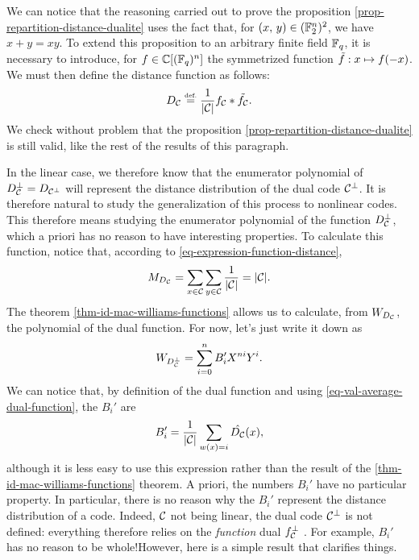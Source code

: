  
\begin{rem}
We can notice that the reasoning carried out to prove the proposition \ref{prop-repartition-distance-dualite} uses the fact that, for $ (x, \, y) \in (\mathbb{F}_2^n)^2 $, we have $ x + y = xy $. To extend this proposition to an arbitrary finite field $ \mathbb{F}_q $, it is necessary to introduce, for $ f \in \mathbb{C} [(\mathbb{F}_q)^n] $ the symmetrized function $ \tilde{f}: x \mapsto f(- x) $. We must then define the distance function as follows:
\begin{equation*}
D_{\mathcal{C}} \stackrel{\mbox{\upshape\tiny def.}}{=} \frac{1}{| \mathcal{C} |} f_{\mathcal{C}} * \tilde{f_{\mathcal{C}}}.
\end{equation*}
We check without problem that the proposition \ref{prop-repartition-distance-dualite} is still valid, like the rest of the results of this paragraph.
\end{rem}
  In the linear case, we therefore know that the enumerator polynomial of $ D_{\mathcal{C}}^\bot = D_{\mathcal{C}^\bot} $ will represent the distance distribution of the dual code $ \mathcal{C}^\bot $. It is therefore natural to study the generalization of this process to nonlinear codes. This therefore means studying the enumerator polynomial of the function $ D_{\mathcal{C}}^\bot $, which a priori has no reason to have interesting properties. To calculate this function, notice that, according to \eqref{eq-expression-function-distance},
\begin{equation}
\label{eq-val-average-dual-function}
M_{D_{\mathcal{C}}} = \sum_{x \in \mathcal{C}}{\sum_{y \in \mathcal{C}}{\frac{1}{| \mathcal{C} |}}} = | \mathcal{C} |.
\end{equation}
The theorem \ref{thm-id-mac-williams-functions} allows us to calculate, from $ W_{D_{\mathcal{C}}} $, the polynomial of the dual function. For now, let's just write it down as
\begin{equation}
\label{eq-defn-repartition-distance-duale}
W_{D_{\mathcal{C}}^\bot} = \sum_{i = 0}^n{B_i'X^{ni} Y^i}.
\end{equation}
We can notice that, by definition of the dual function and using \eqref{eq-val-average-dual-function}, the $ B_i'$ are
\begin{equation*}
B_i'= \frac{1}{| \mathcal{C} |} \sum_{w (x) = i}{\hat{D_{\mathcal{C}}} (x)},
\end{equation*}
although it is less easy to use this expression rather than the result of the \ref{thm-id-mac-williams-functions} theorem. A priori, the numbers $ B_i'$ have no particular property. In particular, there is no reason why the $ B_i'$ represent the distance distribution of a code. Indeed, $ \mathcal{C} $ not being linear, the dual code $ \mathcal{C}^\bot $ is not defined: everything therefore relies on the \textit{function} dual $ f_{\mathcal{C}}^\bot $ . For example, $ B_i'$ has no reason to be whole!However, here is a simple result that clarifies things.
 
